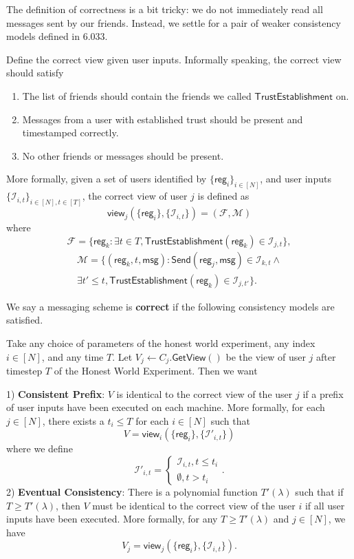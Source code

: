 \documentclass[sigconf, nonacm, balance=false, natbib=false, screen]{acmart}
\newcommand{\msg}{\mathsf{msg}}
\newcommand{\reg}{\mathsf{reg}}
\newcommand{\cI}{\mathcal{I}}
\newcommand{\cF}{\mathcal{F}}
\newcommand{\cM}{\mathcal{M}}
\begin{document}
The definition of correctness is a bit tricky: we do not immediately read all messages sent by our friends. Instead, we settle for a pair of weaker consistency models defined in 6.033. %
\begin{definition}
Define the correct view given user inputs. Informally speaking, the correct view should satisfy
\begin{enumerate}
    \item The list of friends should contain the friends we called $\mathsf{TrustEstablishment}$ on.         
    \item Messages from a user with established trust should be present and timestamped correctly.  
    \item No other friends or messages should be present. 
\end{enumerate}
More formally, given a set of users identified by $\{\reg_i\}_{i \in [N]}$, and user inputs $\{\cI_{i, t}\}_{i \in [N], t \in [T]}$, the correct view of user $j$ is defined as
$$\mathsf{view}_j(\{\reg_i\}, \{\cI_{i, t}\}) = (\cF, \cM)$$
where
$$\cF = \{\reg_k: \exists t \in T, \mathsf{TrustEstablishment}(\reg_k) \in \cI_{j, t}\},$$
\begin{multline*}
 \cM = \{(\reg_k, t, \msg): \mathsf{Send}(\reg_j, \msg) \in \cI_{k, t} \land \\
 \exists t' \leq t, \mathsf{TrustEstablishment}(\reg_k) \in \cI_{j, t'}\}.   
\end{multline*}
\end{definition}
\begin{definition}[Correctness]
 We say a messaging scheme is \textbf{correct} if the following consistency models are satisfied. 
 
 Take any choice of parameters of the honest world experiment, any index $i \in [N]$, and any time $T$. Let $V_j \leftarrow C_j.\mathsf{GetView}()$ be the view of user $j$ after timestep $T$ of the Honest World Experiment. Then we want

1) \textbf{Consistent Prefix}: $V$ is identical to the correct view of the user $j$ if a prefix of user inputs have been executed on each machine. More formally, for each $j \in [N]$, there exists a $t_i \leq T$ for each $i \in [N]$ such that 
$$V = \mathsf{view}_i(\{\reg_i\}, \{\cI'_{i, t}\})$$
where we define
$$\cI'_{i, t} = \begin{cases}
\cI_{i, t}, t \leq t_i \\
\emptyset, t > t_i
\end{cases}.$$
2) \textbf{Eventual Consistency}: There is a polynomial function $T'(\lambda)$ such that if $T \geq T'(\lambda)$, then $V$ must be identical to the correct view of the user $i$ if all user inputs have been executed. More formally, for any $T \geq T'(\lambda)$ and $j \in [N]$, we have
$$V_j = \mathsf{view}_j(\{\reg_i\}, \{\cI_{i, t}\}).$$

\end{definition}
\end{document}

